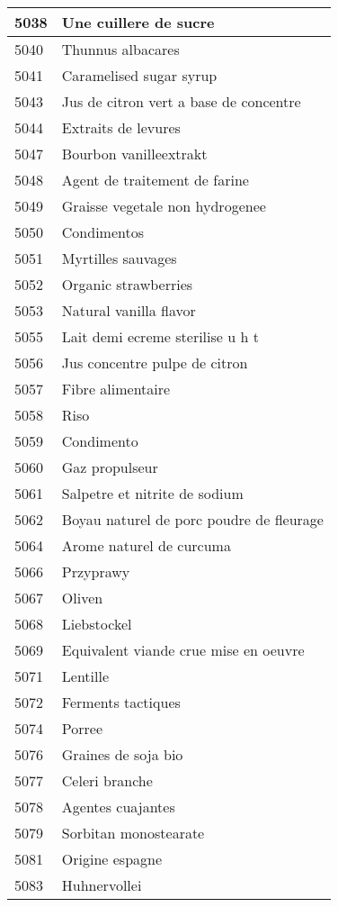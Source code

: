 \begin{longtable}{|l|l|}
5038 & Une cuillere de sucre \\ \hline 
5040 & Thunnus albacares \\ \hline 
5041 & Caramelised sugar syrup \\ \hline 
5043 & Jus de citron vert a base de concentre \\ \hline 
5044 & Extraits de levures \\ \hline 
5047 & Bourbon vanilleextrakt \\ \hline 
5048 & Agent de traitement de farine \\ \hline 
5049 & Graisse vegetale non hydrogenee \\ \hline 
5050 & Condimentos \\ \hline 
5051 & Myrtilles sauvages \\ \hline 
5052 & Organic strawberries \\ \hline 
5053 & Natural vanilla flavor \\ \hline 
5055 & Lait demi ecreme sterilise u h t \\ \hline 
5056 & Jus concentre pulpe de citron \\ \hline 
5057 & Fibre alimentaire \\ \hline 
5058 & Riso \\ \hline 
5059 & Condimento \\ \hline 
5060 & Gaz propulseur \\ \hline 
5061 & Salpetre et nitrite de sodium \\ \hline 
5062 & Boyau naturel de porc poudre de fleurage \\ \hline 
5064 & Arome naturel de curcuma \\ \hline 
5066 & Przyprawy \\ \hline 
5067 & Oliven \\ \hline 
5068 & Liebstockel \\ \hline 
5069 & Equivalent viande crue mise en oeuvre \\ \hline 
5071 & Lentille \\ \hline 
5072 & Ferments tactiques \\ \hline 
5074 & Porree \\ \hline 
5076 & Graines de soja bio \\ \hline 
5077 & Celeri branche \\ \hline 
5078 & Agentes cuajantes \\ \hline 
5079 & Sorbitan monostearate \\ \hline 
5081 & Origine espagne \\ \hline 
5083 & Huhnervollei \\ \hline 

\end{longtable}
